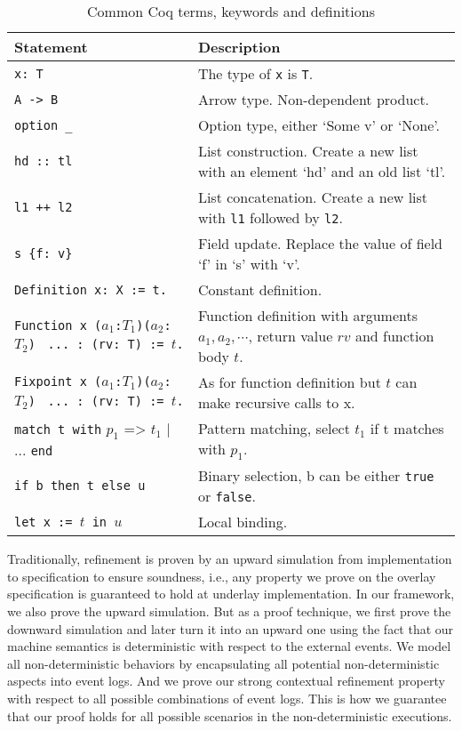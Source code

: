 \begin{table}
	\begin{tabular}[t]{p{}p{}}
	\hline
		{\centering Statement}	&	{\centering Description} \\
	\hline
		\texttt{x: T}					&	The type of \texttt{x} is \texttt{T}.\\
		\texttt{A -> B}					& 	Arrow type. Non-dependent product.\\
		\texttt{option \_}				&	Option type, either `Some v' or `None'.\\
		\texttt{hd :: tl}				&	List construction. Create a new list with an element `hd' and an old list `tl'.\\
		\texttt{l1 ++ l2}				& 	List concatenation. Create a new list with \texttt{l1} followed by \texttt{l2}.\\
		\texttt{s \{f: v\}}				&	Field update. Replace the value of field `f' in `s' with `v'. \\
		\texttt{Definition x: X := t.}	&	Constant definition. \\
		\parbox[t]{.3\textwidth}{\texttt{Function x ($a_1$:$T_1$)($a_2$:$T_2$)}\\
		\texttt{\hphantom{Func} ... : (rv: T) := $t$.}}
		 & Function definition with arguments $a_1, a_2, \cdots$, return value $rv$ and function body $t$.\\
		 \parbox[t]{.3\textwidth}{\texttt{Fixpoint x ($a_1$:$T_1$)($a_2$:$T_2$)}\\
		 \texttt{\hphantom{Fixp} ... : (rv: T) := $t$.}}
		 & As for function definition but $t$ can make recursive calls to x. \\
		\texttt{match t with} $p_1$ => $t_1$ | ...	\texttt{end}	&	Pattern matching, select $t_1$ if t matches with $p_1$.\\
		\texttt{if b then t else u}		&	Binary selection, b can be either \texttt{true} or \texttt{false}.\\
		\texttt{let x := $t$ in $u$}	&	Local binding.\\
		\hline
	\end{tabular}
	\caption{Common Coq terms, keywords and definitions}
	\label{table:coq}
\end{table}


Traditionally, refinement is proven by an upward simulation from implementation
to specification to ensure soundness, i.e., any property we prove on the overlay
specification is guaranteed to hold at underlay implementation. In our framework,
we also prove the upward simulation. But as a proof technique, we first prove the
downward simulation and later turn it into an upward one using the fact that our
machine semantics is deterministic with respect to the external events. We model
all non-deterministic behaviors by encapsulating all potential non-deterministic aspects
into event logs. And we prove our strong contextual refinement property with respect
to all possible combinations of event logs. This is how we guarantee
that our proof holds for all possible scenarios in the non-deterministic
executions. 

